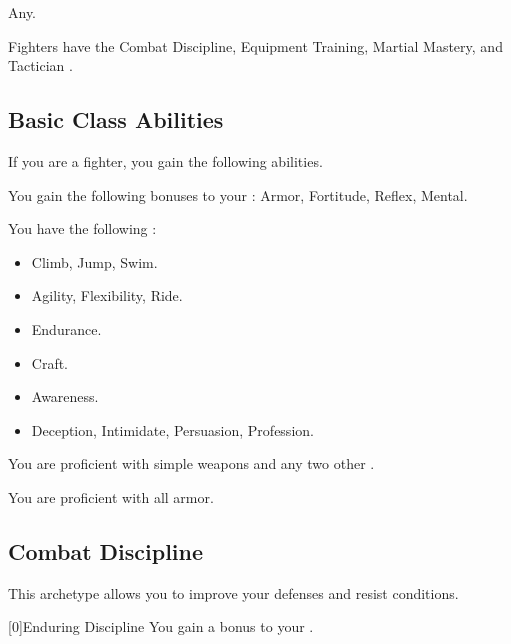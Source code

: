      Any.

     Fighters have the Combat Discipline, Equipment Training, Martial Mastery, and Tactician .

    \subsection{Basic Class Abilities}
        If you are a fighter, you gain the following abilities.

        You gain the following bonuses to your :  Armor,  Fortitude,  Reflex,  Mental.

        You have the following :
        \begin{itemize}
            \item {} Climb, Jump, Swim.
            \item {} Agility, Flexibility, Ride.
            \item {} Endurance.
            \item {} Craft.
            \item {} Awareness.
            \item {} Deception, Intimidate, Persuasion, Profession.
        \end{itemize}

        You are proficient with simple weapons and any two other .

        You are proficient with all armor.

    \newpage
    \subsection{Combat Discipline}
        This archetype allows you to improve your defenses and resist conditions.

        [0]{Enduring Discipline} You gain a  bonus to your .

